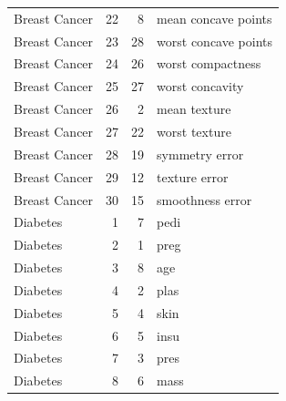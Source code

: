 \begin{longtable}{lrrp{}}
Breast Cancer & 22 & 8 & mean concave points \\
Breast Cancer & 23 & 28 & worst concave points \\
Breast Cancer & 24 & 26 & worst compactness \\
Breast Cancer & 25 & 27 & worst concavity \\
Breast Cancer & 26 & 2 & mean texture \\
Breast Cancer & 27 & 22 & worst texture \\
Breast Cancer & 28 & 19 & symmetry error \\
Breast Cancer & 29 & 12 & texture error \\
Breast Cancer & 30 & 15 & smoothness error \\
Diabetes & 1 & 7 & pedi \\
Diabetes & 2 & 1 & preg \\
Diabetes & 3 & 8 & age \\
Diabetes & 4 & 2 & plas \\
Diabetes & 5 & 4 & skin \\
Diabetes & 6 & 5 & insu \\
Diabetes & 7 & 3 & pres \\
Diabetes & 8 & 6 & mass \\
\end{longtable}
